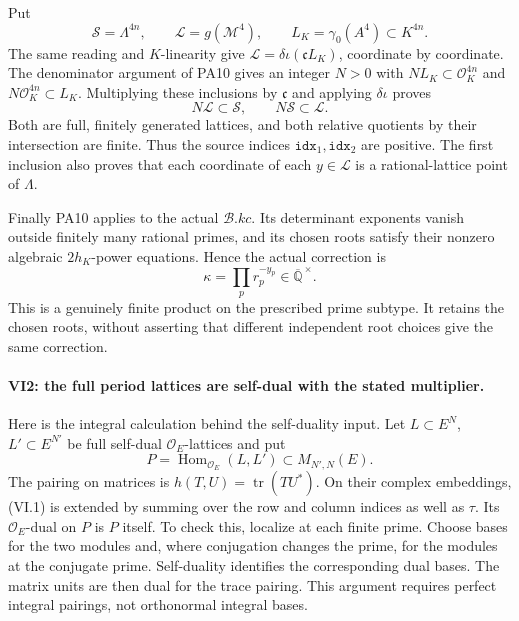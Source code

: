 Put
\[
 \mathcal S=\Lambda^{4n},\qquad
 \mathcal L=g(\mathcal M^4),\qquad
 L_K=\gamma_0(A^4)\subset K^{4n}.
 \tag{VI1.2}
\]
The same reading and \(K\)-linearity give
\(\mathcal L=\delta\iota(\mathfrak c L_K)\), coordinate by coordinate.
The denominator argument of PA10 gives an integer \(N>0\) with
\(NL_K\subset\mathcal O_K^{4n}\) and
\(N\mathcal O_K^{4n}\subset L_K\). Multiplying these inclusions
by \(\mathfrak c\) and applying \(\delta\iota\) proves
\[
                N\mathcal L\subset\mathcal S,\qquad
                N\mathcal S\subset\mathcal L.
 \tag{VI1.3}
\]
Both are full, finitely generated lattices, and both relative
quotients by their intersection are finite. Thus the source
indices \(\texttt{idx}_1,\texttt{idx}_2\) are positive. The first
inclusion also proves that each coordinate of each \(y\in\mathcal L\)
is a rational-lattice point of \(\Lambda\).

Finally PA10 applies to the actual \(\mathscr B.kc\). Its determinant
exponents vanish outside finitely many rational primes, and its
chosen roots satisfy their nonzero algebraic \(2h_K\)-power
equations. Hence the actual correction is
\[
                  \kappa=\prod_p r_p^{-y_p}
                         \in\overline{\mathbb Q}^{\,\times}.
 \tag{VI1.4}
\]
This is a genuinely finite product on the prescribed prime subtype.
It retains the chosen roots, without asserting that different
independent root choices give the same correction.

\paragraph{VI2: the full period lattices are self-dual with the stated multiplier.}
Here is the integral calculation behind the self-duality input.
Let \(L\subset E^N\), \(L'\subset E^{N'}\) be full self-dual
\(\mathcal O_E\)-lattices and put
\[
 P=\operatorname{Hom}_{\mathcal O_E}(L,L')
       \subset M_{N',N}(E).
 \tag{VI2.1}
\]
The pairing on matrices is \(h(T,U)=\operatorname{tr}(TU^*)\).
On their complex embeddings, (VI.1) is extended by summing
over the row and column indices as well as \(\tau\).
Its \(\mathcal O_E\)-dual on \(P\) is \(P\) itself. To check
this, localize at each finite prime. Choose bases for the two
modules and, where conjugation changes the prime, for the modules
at the conjugate prime. Self-duality identifies the corresponding
dual bases. The matrix units are then dual for the trace pairing.
This argument requires perfect integral pairings, not orthonormal
integral bases.


